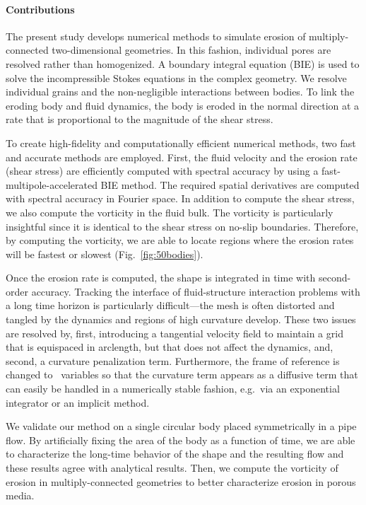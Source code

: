 \documentclass[preprint, 10pt]{elsarticle}
\begin{document}
\paragraph{Contributions} The present study develops numerical methods
to simulate erosion of multiply-connected two-dimensional geometries.
In this fashion, individual pores are resolved rather than
homogenized.  A boundary integral equation (BIE) is used to solve the
incompressible Stokes equations in the complex geometry.  We resolve
individual grains and the non-negligible interactions between bodies.
To link the eroding body and fluid dynamics, the body is eroded in the
normal direction at a rate that is proportional to the magnitude of the
shear stress.

To create high-fidelity and computationally efficient numerical methods,
two fast and accurate methods are employed.  First, the fluid velocity
and the erosion rate (shear stress) are efficiently computed with
spectral accuracy by using a fast-multipole-accelerated BIE method.  The
required spatial derivatives are computed with spectral accuracy in
Fourier space.  In addition to compute the shear stress, we also compute
the vorticity in the fluid bulk.  The vorticity is
particularly insightful since it is identical to the shear stress on
no-slip boundaries.  Therefore, by computing the vorticity, we are able
to locate regions where the erosion rates will be fastest or slowest
(Fig.~\ref{fig:50bodies}).

Once the erosion rate is computed, the shape is integrated in time with
second-order accuracy.  Tracking the interface of fluid-structure
interaction problems with a long time horizon is particularly
difficult---the mesh is often distorted and tangled by the dynamics and
regions of high curvature develop.  These two issues are resolved by,
first, introducing a tangential velocity field to maintain a grid that
is equispaced in arclength, but that does not affect the dynamics, and,
second, a curvature penalization term.  Furthermore, the frame of
reference is changed to \thL~variables so that the curvature term
appears as a diffusive term that can easily be handled in a numerically
stable fashion, e.g.~via an exponential integrator or an implicit
method.

We validate our method on a single circular body placed symmetrically in
a pipe flow.  By artificially fixing the area of the body as a function
of time, we are able to characterize the long-time behavior of the shape
and the resulting flow and these results agree with analytical results.
Then, we compute the vorticity of erosion in multiply-connected
geometries to better characterize erosion in porous media. 
\end{document}
